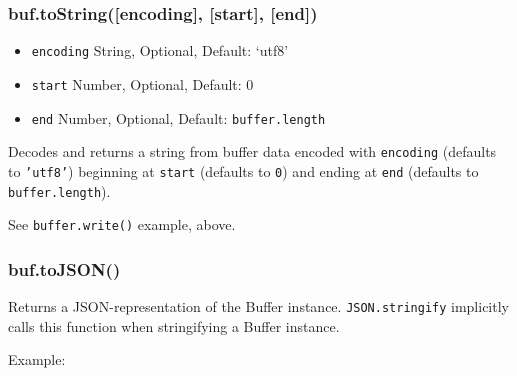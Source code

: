 \subsubsection{buf.toString({[}encoding{]}, {[}start{]}, {[}end{]})}

\begin{itemize}
\item
  \texttt{encoding} String, Optional, Default: `utf8'
\item
  \texttt{start} Number, Optional, Default: 0
\item
  \texttt{end} Number, Optional, Default: \texttt{buffer.length}
\end{itemize}

Decodes and returns a string from buffer data encoded with
\texttt{encoding} (defaults to \texttt{'utf8'}) beginning at
\texttt{start} (defaults to \texttt{0}) and ending at \texttt{end}
(defaults to \texttt{buffer.length}).

See \texttt{buffer.write()} example, above.

\subsubsection{buf.toJSON()}

Returns a JSON-representation of the Buffer instance.
\texttt{JSON.stringify} implicitly calls this function when stringifying
a Buffer instance.

Example:

\begin{Shaded}
\begin{Highlighting}[]
  \NormalTok{);}
 


 
      \NormalTok{=== }
       \NormalTok{)}
  \NormalTok{\});}

\end{Highlighting}
\end{Shaded}

